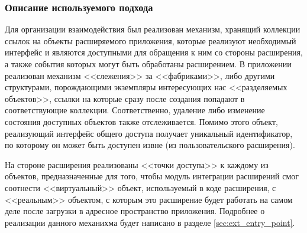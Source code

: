 \subsubsection{Описание используемого подхода}

Для организации взаимодействия был реализован механизм, хранящий коллекции ссылок на объекты расширяемого приложения, которые реализуют необходимый интерфейс и являются доступными для обращения к ним со стороны расширения, а также события которых могут быть обработаны расширением. В приложении реализован механизм <<слежения>> за <<фабриками>>, либо другими структурами, порождающими экземпляры интересующих нас <<разделяемых объектов>>, ссылки на которые сразу после создания попадают в соответствующие коллекции. Соответственно, удаление либо изменение состояния доступных объектов также отслеживается. Помимо этого объект, реализующий интерфейс общего доступа получает уникальный идентификатор, по которому он может быть доступен извне (из пользовательского расширения).

На стороне расширения реализованы <<точки доступа>> к каждому из объектов, предназначенные для того, чтобы модуль интеграции расширений смог соотнести <<виртуальный>> объект, используемый в коде расширения, с <<реальным>> объектом, с которым это расширение будет работать на самом деле после загрузки в адресное пространство приложения. Подробнее о реализации данного механихма будет написано в разделе \ref{sec:ext_entry_point}.

\pagebreak
